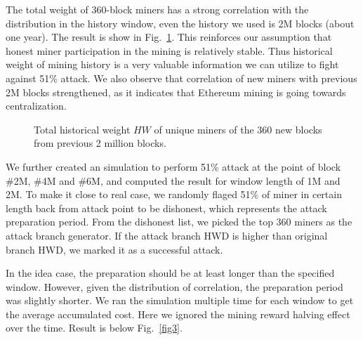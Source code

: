 \documentclass[conference]{IEEEtran}
\begin{document}
The total weight of 360-block miners has a strong correlation with the distribution in the history window, even the history we used is 2M blocks (about one year). The result is show in Fig.~\ref{fig2}. This reinforces our assumption that honest miner participation in the mining is relatively stable. Thus historical weight of mining history is a very valuable information we can utilize to fight against 51\% attack. We also observe that correlation of new miners with previous 2M blocks strengthened, as it indicates that Ethereum mining is going towards centralization. 

\begin{figure}[htbp]
    \caption{Total historical weight $H\!W$ of unique miners of the 360 new blocks from previous 2 million blocks.}
    \label{fig2}
    \end{figure}    
    
We further created an simulation to perform 51\% attack at the point of block \#2M, \#4M and \#6M, and computed the result for window length of 1M and 2M. To make it close to real case, we randomly flaged 51\% of miner in certain length back from attack point to be dishonest, which represents the attack preparation period. From the dishonest list, we picked the top 360 miners as the attack branch generator. If the attack branch HWD is higher than original branch HWD, we marked it as a successful attack. 

In the idea case, the preparation should be at least longer than the specified window. However, given the distribution of correlation, the preparation period was slightly shorter. We ran the simulation multiple time for each window to get the average accumulated cost. Here we ignored the mining reward halving effect over the time. Result is below Fig.~\ref{fig3}.
\end{document}
